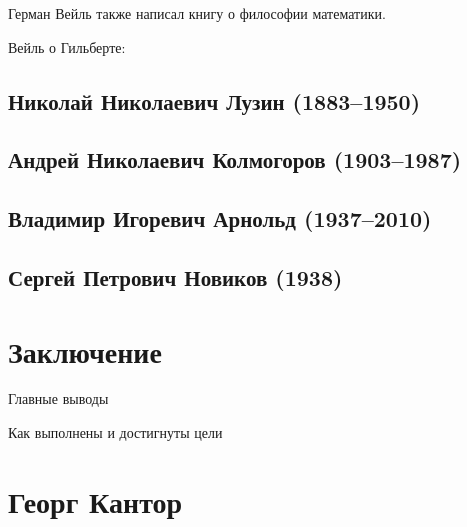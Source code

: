 \documentclass[a4paper,14pt]{article}
\begin{document}
Герман Вейль также написал книгу о философии математики.

Вейль о Гильберте: 

\subsection{Николай Николаевич Лузин (1883--1950)}

\subsection{Андрей Николаевич Колмогоров (1903--1987)}

\subsection{Владимир Игоревич Арнольд (1937--2010)}

\subsection{Сергей Петрович Новиков (1938)}



\section{Заключение}
Главные выводы

Как выполнены и достигнуты цели

\section{Георг Кантор}

\nocite{*}
\printbibliography
\end{document}
